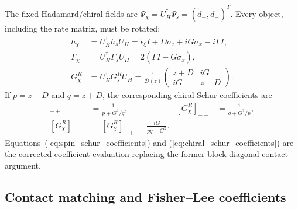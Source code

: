 \documentclass[%
  aps,prb,reprint,amsmath,amssymb,superscriptaddress,longbibliography,floatfix
]{revtex4-2}
\newcommand{\teps}{\tilde{\epsilon}_{\xi}}
\begin{document}
The fixed Hadamard/chiral fields are
$\Psi_\chi=U_H^\dagger\Psi_s=(\widetilde d_+,\widetilde d_-)^T$.
Every object, including the rate matrix, must be rotated:
\begin{align}
h_\chi&=U_H^\dagger h_sU_H
=\teps I+D\sigma_z+iG\sigma_x-i\bar\Gamma I,\nonumber\\
\Gamma_\chi&=U_H^\dagger\Gamma_sU_H
=2(\bar\Gamma I-G\sigma_x),\nonumber\\
G_\chi^R&=U_H^\dagger G_s^RU_H
=\frac{1}{\mathcal D(z)}
\begin{pmatrix}
z+D&iG\\ iG&z-D
\end{pmatrix}.
\label{eq:chiral_kernel_rate_green}
\end{align}
If $p=z-D$ and $q=z+D$, the corresponding chiral Schur coefficients are
\begin{align}
[G_\chi^R]_{++}
&=\frac{1}{p+G^2/q},&
[G_\chi^R]_{--}
&=\frac{1}{q+G^2/p},\nonumber\\
[G_\chi^R]_{+-}
&=[G_\chi^R]_{-+}
=\frac{iG}{pq+G^2}.
\label{eq:chiral_schur_coefficients}
\end{align}
Equations~(\ref{eq:spin_schur_coefficients}) and
(\ref{eq:chiral_schur_coefficients}) are the corrected coefficient
evaluation replacing the former block-diagonal contact argument.

\subsection{Contact matching and Fisher--Lee coefficients}
\end{document}

